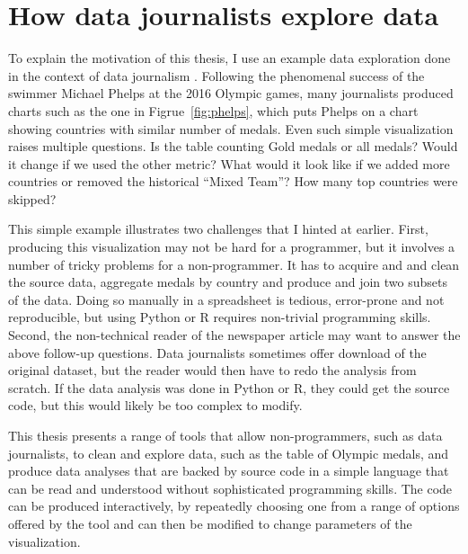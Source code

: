 \documentclass[fleqn,11pt]{report}
\theoremstyle{definition}
\begin{document}
\section{How data journalists explore data}
\label{sec:intro-ddj}

To explain the motivation of this thesis, I use an example data exploration done in the context of
data journalism \citep{bounegru-2021-handbook}. Following the phenomenal success of the swimmer
Michael Phelps at the 2016 Olympic games, many journalists produced charts such as the one
in Figrue~\ref{fig:phelps}, which puts Phelps on a chart showing countries with similar number
of medals. Even such simple visualization raises multiple questions. Is the table counting
Gold medals or all medals? Would it change if we used the other metric? What would it look like
if we added more countries or removed the historical ``Mixed Team''? How many top countries
were skipped?

This simple example illustrates two challenges that I hinted at earlier. First, producing this
visualization may not be hard for a programmer, but it involves a number of tricky problems
for a non-programmer. It has to acquire and and clean the source data, aggregate medals by
country and produce and join two subsets of the data. Doing so manually in a spreadsheet
is tedious, error-prone and not reproducible, but using Python or R requires non-trivial programming
skills. Second, the non-technical reader of the newspaper article may want to answer the above
follow-up questions. Data journalists sometimes offer download of the original dataset, but the
reader would then have to redo the analysis from scratch. If the data analysis was done in Python
or R, they could get the source code, but this would likely be too complex to modify.

This thesis presents a range of tools that allow non-programmers, such as data journalists, to
clean and explore data, such as the table of Olympic medals, and produce data analyses that are
backed by source code in a simple language that can be read and understood without sophisticated
programming skills. The code can be produced interactively, by repeatedly choosing one from a
range of options offered by the tool and can then be modified to change parameters of the
visualization.
\end{document}
